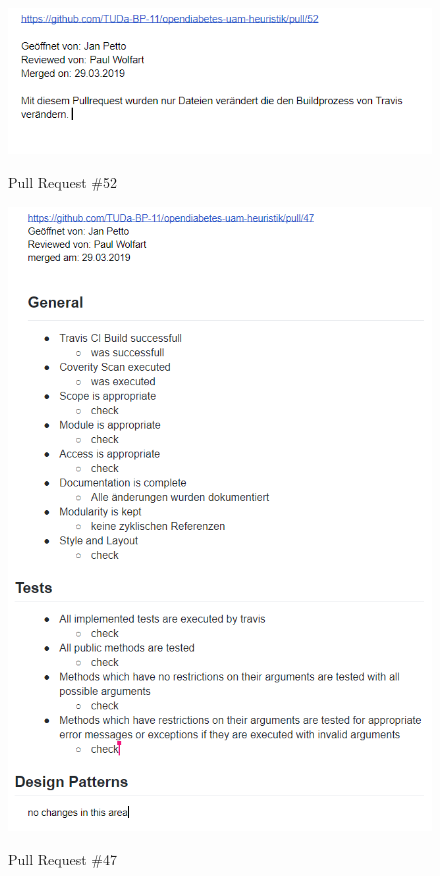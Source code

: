 \documentclass[accentcolor=tud0b,12pt,paper=a4]{tudreport}
\begin{document}
\begin{figure}[h]
\centering
\caption{Pull Request \#52}
\includegraphics[width=\textwidth,height=\textheight,keepaspectratio]{pr-52}
\label{pr:52}
\end{figure}

\begin{figure}[h]
\centering
\caption{Pull Request \#47}
\includegraphics[width=\textwidth,height=\textheight,keepaspectratio]{pr-47}
\label{pr:47}
\end{figure}
\end{document}
